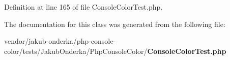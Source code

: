 Definition at line 165 of file Console\+Color\+Test.\+php.



The documentation for this class was generated from the following file\+:\begin{DoxyCompactItemize}
\item 
vendor/jakub-\/onderka/php-\/console-\/color/tests/\+Jakub\+Onderka/\+Php\+Console\+Color/{\bf Console\+Color\+Test.\+php}\end{DoxyCompactItemize}

